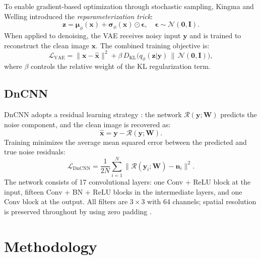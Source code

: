 \documentclass[conference]{IEEEtran}
\begin{document}
To enable gradient-based optimization through stochastic sampling,
Kingma and Welling introduced the \textit{reparameterization trick}:
\begin{equation}
  \mathbf{z} = \boldsymbol{\mu}_\phi(\mathbf{x})
    + \boldsymbol{\sigma}_\phi(\mathbf{x}) \odot \boldsymbol{\epsilon},
    \quad \boldsymbol{\epsilon} \sim \mathcal{N}(\mathbf{0}, \mathbf{I}).
\end{equation}
When applied to denoising, the VAE receives noisy input \(\mathbf{y}\)
and is trained to reconstruct the clean image \(\mathbf{x}\). The
combined training objective is:
\begin{equation}
  \mathcal{L}_\text{VAE} =
    \|\mathbf{x} - \hat{\mathbf{x}}\|^2
    + \beta\, D_\text{KL}\bigl(q_\phi(\mathbf{z}|\mathbf{y})
    \,\|\, \mathcal{N}(\mathbf{0}, \mathbf{I})\bigr),
\end{equation}
where \(\beta\) controls the relative weight of the KL regularization term.

\subsection{DnCNN}

DnCNN \cite{zhang2017beyond} adopts a residual learning strategy
\cite{he2016deep}: the network \(\mathcal{R}(\mathbf{y};\mathbf{W})\)
predicts the noise component, and the clean image is recovered as:
\begin{equation}
  \hat{\mathbf{x}} = \mathbf{y} - \mathcal{R}(\mathbf{y};\mathbf{W}).
\end{equation}
Training minimizes the average mean squared error between the predicted
and true noise residuals:
\begin{equation}
  \mathcal{L}_\text{DnCNN} =
    \frac{1}{2N}\sum_{i=1}^{N}
    \bigl\|\mathcal{R}(\mathbf{y}_i;\mathbf{W}) - \mathbf{n}_i\bigr\|^2.
\end{equation}
The network consists of 17 convolutional layers: one Conv + ReLU block at
the input, fifteen Conv + BN + ReLU blocks in the intermediate layers,
and one Conv block at the output. All filters are \(3\times3\) with 64
channels; spatial resolution is preserved throughout by using zero
padding \cite{zhang2017beyond}.

\section{Methodology}
\end{document}
